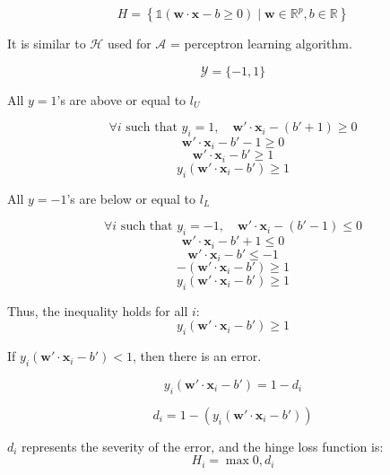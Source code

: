 \documentclass[12pt]{article}
\begin{document}

\begin{enumerate}


\[
H = \left\{ \mathbb{1} \left( \mathbf{w} \cdot \mathbf{x} - b \geq 0 \right) \mid \mathbf{w} \in \mathbb{R}^p, b \in \mathbb{R} \right\}
\]

It is similar to $\mathcal{H}$ used for $\mathcal{A}$ = perceptron learning algorithm.




\[ \mathcal{Y} = \{-1,1\} \]

All \( y = 1 \)'s are above or equal to \( l_U \)

\[ \forall i \text{ such that } y_i = 1, \quad \mathbf{w'} \cdot \mathbf{x}_i - (b' + 1) \geq 0 \]
\[ \mathbf{w'} \cdot \mathbf{x}_i - b' - 1 \geq 0 \]
\[ \mathbf{w'} \cdot \mathbf{x}_i - b' \geq 1 \]
\[ y_i (\mathbf{w'} \cdot \mathbf{x}_i - b') \geq 1 \]

All \( y = -1 \)'s are below or equal to \( l_L \)

\[ \forall i \text{ such that } y_i = -1, \quad \mathbf{w'} \cdot \mathbf{x}_i - (b' - 1) \leq 0 \]
\[ \mathbf{w'} \cdot \mathbf{x}_i - b' + 1 \leq 0 \]
\[ \mathbf{w'} \cdot \mathbf{x}_i - b' \leq -1 \]
\[ - (\mathbf{w'} \cdot \mathbf{x}_i - b') \geq 1 \]
\[ y_i (\mathbf{w'} \cdot \mathbf{x}_i - b') \geq 1 \]

Thus, the inequality holds for all \( i \):
\[ y_i (\mathbf{w'} \cdot \mathbf{x}_i - b') \geq 1 \]

If \( y_i (\mathbf{w'} \cdot \mathbf{x}_i - b') < 1 \), then there is an error.

\[ y_i (\mathbf{w'} \cdot \mathbf{x}_i - b') = 1 - d_i \]

\[ d_i = 1 - (y_i (\mathbf{w'} \cdot \mathbf{x}_i - b')) \]

\( d_i \) represents the severity of the error, and the hinge loss function is:
\[ H_i = \max{0,d_i}\]


\end{enumerate}
\end{document}
